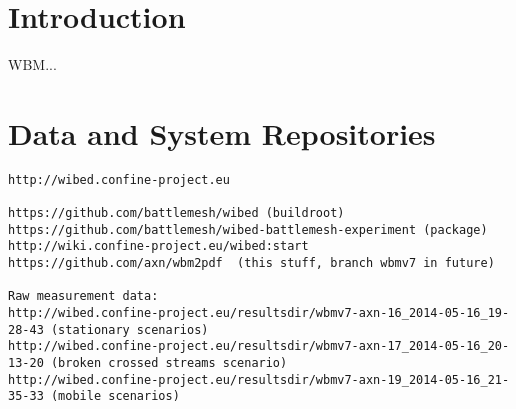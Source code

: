 \documentclass[a4paper,12pt,twoside]{article}
\begin{document}
\section{Introduction}
\label{sec:introduction}


WBM...








\section{Data and System Repositories}



\scriptsize
\begin{verbatim}
http://wibed.confine-project.eu

https://github.com/battlemesh/wibed (buildroot)
https://github.com/battlemesh/wibed-battlemesh-experiment (package)
http://wiki.confine-project.eu/wibed:start
https://github.com/axn/wbm2pdf  (this stuff, branch wbmv7 in future)

Raw measurement data:
http://wibed.confine-project.eu/resultsdir/wbmv7-axn-16_2014-05-16_19-28-43 (stationary scenarios)
http://wibed.confine-project.eu/resultsdir/wbmv7-axn-17_2014-05-16_20-13-20 (broken crossed streams scenario)
http://wibed.confine-project.eu/resultsdir/wbmv7-axn-19_2014-05-16_21-35-33 (mobile scenarios)

\end{verbatim}
\normalsize
\end{document}
